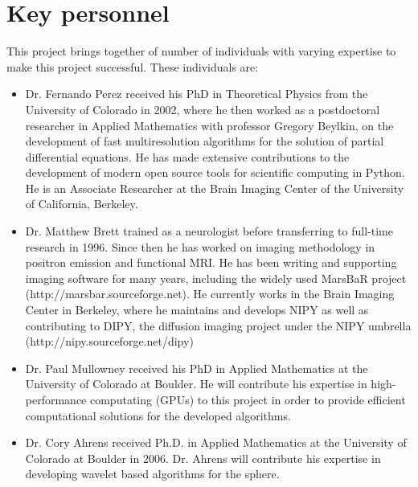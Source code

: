 \documentclass[10pt]{article}
\begin{document}
\section*{Key personnel}
This project brings together of number of individuals with varying expertise to make this project successful. These individuals are:
\begin{itemize}
  \item{Dr. Fernando Perez received his PhD in Theoretical Physics from the University
of Colorado in 2002, where he then worked as a postdoctoral researcher in
Applied Mathematics with professor Gregory Beylkin, on the development of fast
multiresolution algorithms for the solution of partial differential equations.
He has made extensive contributions to the development of modern open source
tools for scientific computing in Python. He is an Associate Researcher at the
Brain Imaging Center of the University of California, Berkeley.}

  \item{Dr. Matthew Brett trained as a neurologist before transferring
    to full-time research in 1996.  Since then he has worked on imaging
    methodology in positron emission and functional MRI.  He has been
    writing and supporting imaging software for many years, including
    the widely used MarsBaR project (http://marsbar.sourceforge.net). He
    currently works in the Brain Imaging Center in Berkeley, where he
    maintains and develops NIPY as well as contributing to DIPY, the
    diffusion imaging project under the NIPY umbrella
    (http://nipy.sourceforge.net/dipy)}
  
  \item{Dr. Paul Mullowney received his PhD in Applied Mathematics at the University of Colorado at Boulder. He will contribute his expertise in high-performance computating (GPUs) to this project in order to provide efficient computational solutions for the developed algorithms.}

  \item{Dr. Cory Ahrens received Ph.D. in Applied Mathematics at the University of Colorado at Boulder in 2006. Dr. Ahrens will contribute his expertise in developing wavelet based algorithms for the sphere.}
  
\end{itemize}




\end{document}
